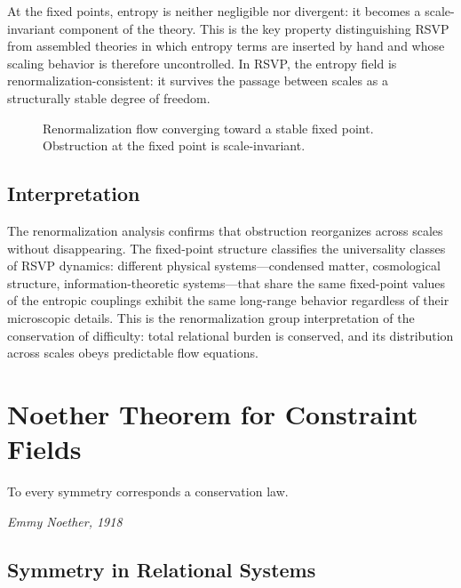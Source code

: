 \documentclass[12pt,a4paper,openany]{book}
\theoremstyle{plain}
\theoremstyle{definition}
\theoremstyle{remark}
\begin{document}
At the fixed points, entropy is neither negligible nor divergent: it becomes a scale-invariant component of the theory. This is the key property distinguishing RSVP from assembled theories in which entropy terms are inserted by hand and whose scaling behavior is therefore uncontrolled. In RSVP, the entropy field is renormalization-consistent: it survives the passage between scales as a structurally stable degree of freedom.

\begin{figure}[h]
\centering
{}
\caption[Entropic RG flow]{Renormalization flow converging toward a stable fixed point. Obstruction at the fixed point is scale-invariant.}
\label{fig:entropy_rg}
\end{figure}

\section{Interpretation}

The renormalization analysis confirms that obstruction reorganizes across scales without disappearing. The fixed-point structure classifies the universality classes of RSVP dynamics: different physical systems---condensed matter, cosmological structure, information-theoretic systems---that share the same fixed-point values of the entropic couplings exhibit the same long-range behavior regardless of their microscopic details. This is the renormalization group interpretation of the conservation of difficulty: total relational burden is conserved, and its distribution across scales obeys predictable flow equations.

\chapter{Noether Theorem for Constraint Fields}
\label{chap:noether_constraint}

\epigraph{%
  To every symmetry corresponds a conservation law.
}{%
  \textit{Emmy Noether, 1918}}

\section{Symmetry in Relational Systems}
\end{document}
